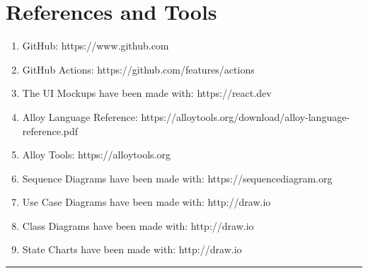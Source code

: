 \documentclass{Configuration_Files/Template}
\begin{document}
\section{References and Tools}

\begin{enumerate}
    \item GitHub: https://www.github.com
    \item GitHub Actions: https://github.com/features/actions
    \item The UI Mockups have been made with: https://react.dev
    \item Alloy Language Reference: https://alloytools.org/download/alloy-language-reference.pdf
    \item Alloy Tools: https://alloytools.org
    \item Sequence Diagrams have been made with: https://sequencediagram.org
    \item Use Case Diagrams have been made with: http://draw.io
    \item Class Diagrams have been made with: http://draw.io
    \item State Charts have been made with: http://draw.io
\end{enumerate}

{\color{bluepoli}\rule{\linewidth}{0.1pt}}
\end{document}
